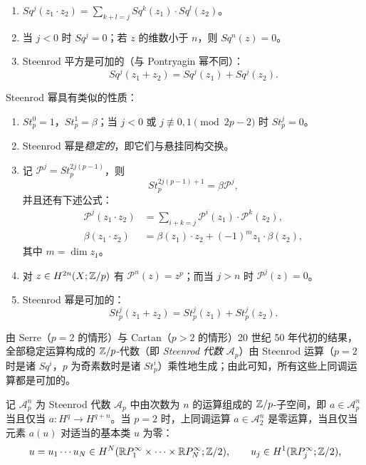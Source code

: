 \begin{enumerate}[label=(\roman*),leftmargin=2.2em,start=3]
\item $Sq^j(z_1\cdot z_2)=\sum\limits_{k+l=j}Sq^k(z_1)\cdot Sq^l(z_2)$。
\item 当 $j<0$ 时 $Sq^j=0$；若 $z$ 的维数小于 $n$，则 $Sq^n(z)=0$。
\item Steenrod 平方是可加的（与 Pontryagin 幂不同）：
\[
Sq^j(z_1+z_2)=Sq^j(z_1)+Sq^j(z_2).
\]
\end{enumerate}

Steenrod 幂具有类似的性质：
\begin{enumerate}[label=(\roman*),leftmargin=2.2em]
\item $St^0_p=1$，$St^1_p=\beta$；当 $j<0$ 或 $j\not\equiv 0,1\pmod{2p-2}$ 时 $St^j_p=0$。
\item Steenrod 幂是\emph{稳定的}，即它们与悬挂同构交换。
\item 记 $\mathcal{P}^j=St^{2j(p-1)}_p$，则
\begin{equation}
St^{2j(p-1)+1}_p=\beta\mathcal{P}^j, \tag{6.9}
\end{equation}
并且还有下述公式：
\begin{equation}
\begin{aligned}
\mathcal{P}^j(z_1\cdot z_2)&=\sum_{i+k=j}\mathcal{P}^i(z_1)\cdot\mathcal{P}^k(z_2),\\
\beta(z_1\cdot z_2)&=\beta(z_1)\cdot z_2+(-1)^m z_1\cdot\beta(z_2),
\end{aligned}
\tag{6.10}
\end{equation}
其中 $m=\dim z_1$。
\item 对 $z\in H^{2n}(X;\mathbb{Z}/p)$ 有 $\mathcal{P}^n(z)=z^p$；而当 $j>n$ 时 $\mathcal{P}^j(z)=0$。
\item Steenrod 幂是可加的：
\[
St^j_p(z_1+z_2)=St^j_p(z_1)+St^j_p(z_2).
\]
\end{enumerate}

由 Serre（$p=2$ 的情形）与 Cartan（$p>2$ 的情形）20 世纪 50 年代初的结果，全部稳定运算构成的 $\mathbb{Z}/p$-代数（即 \emph{Steenrod 代数} $\mathcal{A}_p$）由 Steenrod 运算（$p=2$ 时是诸 $Sq^i$，$p$ 为奇素数时是诸 $St^i_p$）乘性地生成；由此可知，所有这些上同调运算都是可加的。

记 $\mathcal{A}^n_p$ 为 Steenrod 代数 $\mathcal{A}_p$ 中由次数为 $n$ 的运算组成的 $\mathbb{Z}/p$-子空间，即 $a\in\mathcal{A}^n_p$ 当且仅当 $a:H^q\to H^{q+n}$。当 $p=2$ 时，上同调运算 $a\in\mathcal{A}^n_2$ 是零运算，当且仅当元素 $a(u)$ 对适当的基本类 $u$ 为零：
\[
u=u_1\cdots u_N\in H^N(\mathbb{R}P^\infty_1\times\cdots\times\mathbb{R}P^\infty_N;\mathbb{Z}/2),\qquad u_j\in H^1(\mathbb{R}P^\infty_j;\mathbb{Z}/2),
\]

